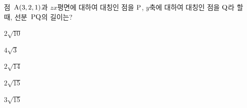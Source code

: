 점~$\mathrm{A}(3{,}\mkern3mu\mathopen{}2{,}\mkern3mu\mathopen{}1)$과 $zx$평면에 대하여 대칭인 점을 $\mathrm{P}$, $y$축에 대하여 대칭인 점을 $\mathrm{Q}$라 할 때, 선분~$\mathrm{PQ}$의 길이는?
\begin{choices32}{\rule[-3ex]{0pt}{8ex}$2\sqrt{10}$}{\rule[-3ex]{0pt}{8ex}$4\sqrt{3}$}{\rule[-3ex]{0pt}{8ex}$2\sqrt{14}$}{\rule[-3ex]{0pt}{8ex}$2\sqrt{15}$}{\rule[-3ex]{0pt}{8ex}$3\sqrt{15}$}\end{choices32}
